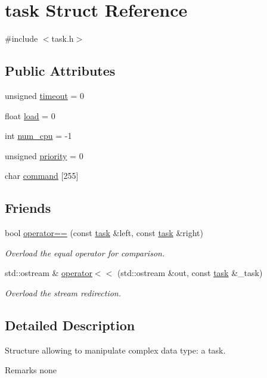 \hypertarget{structtask}{\section{task Struct Reference}
\label{structtask}
}


{\ttfamily \#include $<$task.\-h$>$}

\subsection*{Public Attributes}
\begin{DoxyCompactItemize}
\item 
unsigned \hyperlink{structtask_a4fdb5bb3c0cb5b3db9f07e54563f678a}{timeout} = 0
\item 
float \hyperlink{structtask_a42d5d60beb455655eb8a2d582e515cac}{load} = 0
\item 
int \hyperlink{structtask_a3ed4137e1d0a9047b2a62373958a0f05}{num\-\_\-cpu} = -\/1
\item 
unsigned \hyperlink{structtask_a8ad08ffa8d99b3a1dff092a49080763d}{priority} = 0
\item 
char \hyperlink{structtask_a83f668482e53b3647813fd7dcbe9d137}{command} \mbox{[}255\mbox{]}
\end{DoxyCompactItemize}
\subsection*{Friends}
\begin{DoxyCompactItemize}
\item 
bool \hyperlink{structtask_a5f598c2f37452c23ecb1f842da93319a}{operator==} (const \hyperlink{structtask}{task} \&left, const \hyperlink{structtask}{task} \&right)
\begin{DoxyCompactList}\small\item\em Overload the equal operator for comparison. \end{DoxyCompactList}\item 
std\-::ostream \& \hyperlink{structtask_acf9cb7d6b1b68e8135de2fb5d4770977}{operator$<$$<$} (std\-::ostream \&out, const \hyperlink{structtask}{task} \&\-\_\-task)
\begin{DoxyCompactList}\small\item\em Overload the stream redirection. \end{DoxyCompactList}\end{DoxyCompactItemize}


\subsection{Detailed Description}
Structure allowing to manipulate complex data type\-: a task. \begin{DoxyRemark}{Remarks}
none 
\end{DoxyRemark}



